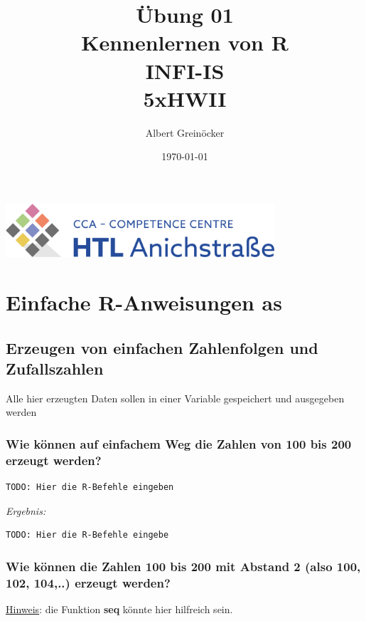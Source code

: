 \documentclass{article}
\title{Übung 01 \\ Kennenlernen von \textbf{R} \\ INFI-IS \\ 5xHWII}
\author{Albert Greinöcker} %
\date{\today} %
\begin{document}
\maketitle %

\begin{center}

\includegraphics[width=10cm]{logo.png}
\end{center}
\vspace{1cm}

\section{Einfache R-Anweisungen as}

\subsection{Erzeugen von einfachen Zahlenfolgen und Zufallszahlen}

Alle hier erzeugten Daten sollen in einer Variable gespeichert und ausgegeben werden

\subsubsection{Wie können auf einfachem Weg die Zahlen von 100 bis 200 erzeugt werden?}


\begin{lstlisting}
TODO: Hier die R-Befehle eingeben
\end{lstlisting}

\textit{Ergebnis:}

\begin{verbatim}
TODO: Hier die R-Befehle eingebe
\end{verbatim}


\subsubsection{Wie können die Zahlen 100 bis 200 mit Abstand 2 (also 100, 102, 104,..) erzeugt werden?}

 \underline{Hinweis}: die Funktion \textbf{seq} könnte hier hilfreich sein.
 
\end{document}
